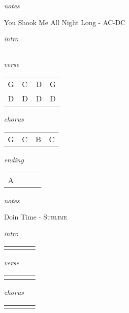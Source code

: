 \documentclass[12pt]{article}
\begin{document}
\textit{notes}

\newpage

{\Huge You Shook Me All Night Long} {\huge - \textsc{AC-DC}}

\huge
\textit{intro}

\begin{tabular}{|P{1.25in}|P{1.25in}|P{1.25in}|P{1.25in}|}

\end{tabular}

\textit{verse}

\begin{tabular}{|P{1.25in}|P{1.25in}|P{1.25in}|P{1.25in}|}
  G & C  & D &  G \\
  D & D & D & D \\
\end{tabular}

\textit{chorus}

\begin{tabular}{|P{1.25in}|P{1.25in}|P{1.25in}|P{1.25in}|}
  G & C  &  B &  C \\
\end{tabular}

\textit{ending}

\begin{tabular}{|P{1.25in}|P{1.25in}|P{1.25in}|P{1.25in}|}
  A &   &   &   \\
\end{tabular}

\textit{notes}

\newpage

{\Huge Doin Time} {\huge - \textsc{Sublime}}

\huge
\textit{intro}

\begin{tabular}{|P{1.25in}|P{1.25in}|P{1.25in}|P{1.25in}|}
    &   &   &   \\
\end{tabular}

\textit{verse}

\begin{tabular}{|P{1.25in}|P{1.25in}|P{1.25in}|P{1.25in}|}
    &   &   &   \\
\end{tabular}

\textit{chorus}

\begin{tabular}{|P{1.25in}|P{1.25in}|P{1.25in}|P{1.25in}|}
    &   &   &   \\
\end{tabular}
\end{document}
